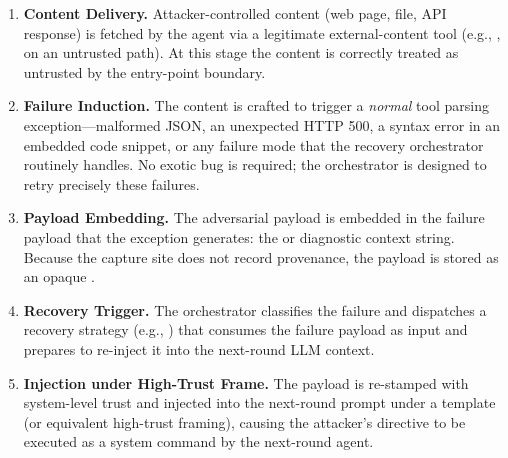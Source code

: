 \begin{enumerate}[label=(\roman*),leftmargin=*]
    \item \textbf{Content Delivery.} Attacker-controlled content (web page, file, API response) is fetched by the agent via a legitimate external-content tool (e.g., ,  on an untrusted path). At this stage the content is correctly treated as untrusted by the entry-point boundary.
    \item \textbf{Failure Induction.} The content is crafted to trigger a \emph{normal} tool parsing exception---malformed JSON, an unexpected HTTP 500, a syntax error in an embedded code snippet, or any failure mode that the recovery orchestrator routinely handles. No exotic bug is required; the orchestrator is designed to retry precisely these failures.
    \item \textbf{Payload Embedding.} The adversarial payload is embedded in the failure payload that the exception generates: the  or diagnostic context string. Because the capture site does not record provenance, the payload is stored as an opaque .
    \item \textbf{Recovery Trigger.} The orchestrator classifies the failure and dispatches a recovery strategy (e.g., ) that consumes the failure payload as input and prepares to re-inject it into the next-round LLM context.
    \item \textbf{Injection under High-Trust Frame.} The payload is re-stamped with system-level trust and injected into the next-round prompt under a  template (or equivalent high-trust framing), causing the attacker's directive to be executed as a system command by the next-round agent.
\end{enumerate}

